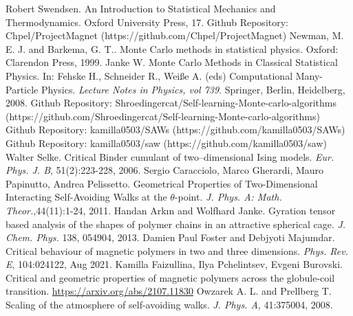 \begin{thebibliography}{20}
 Robert Swendsen. An Introduction to Statistical Mechanics and Thermodynamics. Oxford University Press,  17.
 Github Repository: Chpel/ProjectMagnet (https://github.com/Chpel/ProjectMagnet)
 Newman, M. E. J. and Barkema, G. T.. Monte Carlo methods in statistical physics. Oxford: Clarendon Press, 1999.
 Janke W. Monte Carlo Methods in Classical Statistical Physics. In: Fehske H., Schneider R., Weiße A. (eds) Computational Many-Particle Physics. \emph{Lecture Notes in Physics, vol 739}. Springer, Berlin, Heidelberg, 2008.
 Github Repository: Shroedingercat/Self-learning-Monte-carlo-algorithms (https://github.com/Shroedingercat/Self-learning-Monte-carlo-algorithms)
 Github Repository: kamilla0503/SAWs (https://github.com/kamilla0503/SAWs)
 Github Repository: kamilla0503/saw (https://github.com/kamilla0503/saw)
 Walter Selke. Critical Binder cumulant of two–dimensional Ising models. \emph{Eur. Phys. J. B}, 51(2):223-228, 2006.
 Sergio Caracciolo, Marco Gherardi, Mauro Papinutto, Andrea Pelissetto. Geometrical Properties of Two-Dimensional Interacting Self-Avoiding Walks at the $\theta$-point. \emph{J. Phys. A: Math. Theor.},44(11):1-24, 2011.
 Handan Arkın and Wolfhard Janke. Gyration tensor based analysis of the shapes of polymer chains in an attractive spherical cage. \emph{J. Chem. Phys.} 138, 054904, 2013.
 Damien Paul Foster and Debjyoti Majumdar. Critical behaviour of magnetic polymers in two and three dimensions. \emph{Phys. Rev. E}, 104:024122, Aug 2021.
 Kamilla Faizullina, Ilya Pchelintsev, Evgeni Burovski. Critical and geometric properties of magnetic polymers across the globule-coil transition. \url{https://arxiv.org/abs/2107.11830}
 Owzarek A. L. and Prellberg T. Scaling of the atmosphere of self-avoiding walks. \emph{J. Phys. A}, 41:375004, 2008.

\end{thebibliography}
